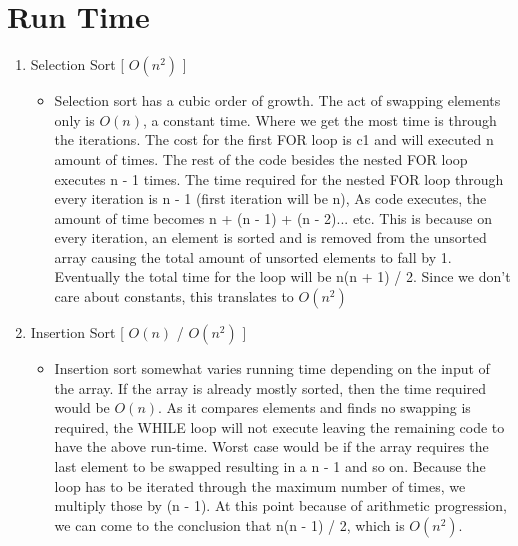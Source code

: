 \documentclass[letterpaper, 10pt,DIV=13]{scrartcl}
\numberwithin{equation}{section} %
\numberwithin{figure}{section} %
\numberwithin{table}{section} %
\begin{document}
\section{Run Time}
\bigskip
\begin{enumerate}
   \item Selection Sort [ $O(n^2)$ ]
   \begin{itemize}
     \item Selection sort has a cubic order of growth. The act of swapping elements only is $O(n)$, a constant time. Where we get the most time is through the iterations. The cost for the first FOR loop is c1 and will executed n amount of times. The rest of the code besides the nested FOR loop executes n - 1 times. The time required for the nested FOR loop through every iteration is n - 1 (first iteration will be n), As code executes, the amount of time becomes n + (n - 1) + (n - 2)... etc. This is because on every iteration, an element is sorted and is removed from the unsorted array causing the total amount of unsorted elements to fall by 1. Eventually the total time for the loop will be n(n + 1) / 2. Since we don't care about constants, this translates to $O(n^2)$
   \end{itemize}
   \bigskip
   \item Insertion Sort [ $O(n)$ / $O(n^2)$ ]
   \begin{itemize}
       \item Insertion sort somewhat varies running time depending on the input of the array. If the array is already mostly sorted, then the time required would be $O(n)$. As it compares elements and finds no swapping is required, the WHILE loop will not execute leaving the remaining code to have the above run-time. Worst case would be if the array requires the last element to be swapped resulting in a n - 1 and so on. Because the loop has to be iterated through the maximum number of times, we multiply those by (n - 1). At this point because of arithmetic progression, we can come to the conclusion that n(n - 1) / 2, which is $O(n^2)$.  
   \end{itemize}
   \bigskip
    

\end{enumerate}
\end{document}
